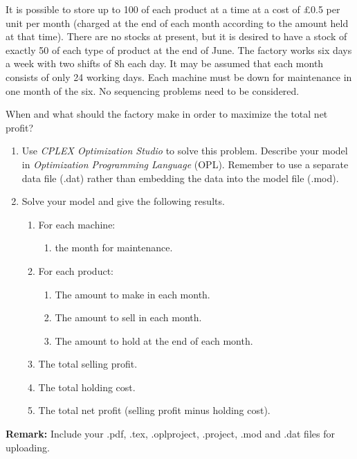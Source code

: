 \documentclass[12pt,a4paper]{article}
\theoremstyle{definition}
\begin{document}
\begin{enumerate}
	It is possible to store up to 100 of each product at a time at a cost of \pounds0.5 per unit per month (charged at the end of each month according to the amount held at that time). There are no stocks at present, but it is desired to have a stock of exactly 50 of each type of product at the end of June. The factory works six days a week with two shifts of 8h each day. It may be assumed that each month consists of only 24 working days. Each machine must be down for maintenance in one month of the six. No sequencing problems need to be considered.
	
	When and what should the factory make in order to maximize the total net profit?
	
	\begin{enumerate}
		\item
		Use \emph{CPLEX Optimization Studio} to solve this problem. Describe your model in \emph{Optimization Programming Language} (OPL). Remember to use a separate data file (.dat) rather than embedding the data into the model file (.mod).
		
		\item
		Solve your model and give the following results.
		\begin{enumerate}
			\item
			For each machine:
			\begin{enumerate}
				\item
				the month for maintenance.
			\end{enumerate}
			\item
			For each product:
			\begin{enumerate}
				\item
				The amount to make in each month.
				\item
				The amount to sell in each month.
				\item
				The amount to hold at the end of each month.
			\end{enumerate}
			\item
			The total selling profit.
			\item
			The total holding cost.
			\item
			The total net profit (selling profit minus holding cost).
		\end{enumerate}
	\end{enumerate}
	
\end{enumerate}



\textbf{Remark:} Include your .pdf, .tex, .oplproject, .project, .mod and .dat files for uploading.


\end{document}
